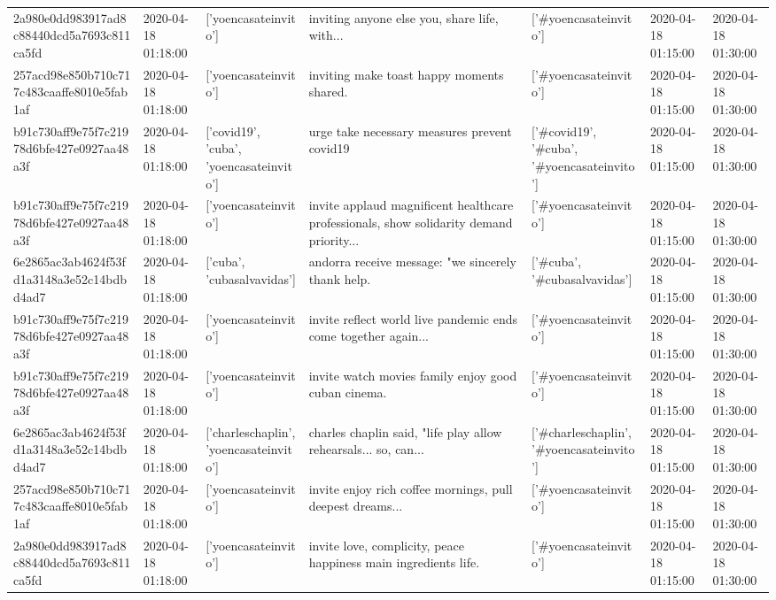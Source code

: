 \begin{tabular}{lllllll}
2a980e0dd983917ad8c88440dcd5a7693c811ca5fd & 2020-04-18 01:18:00 & ['yoencasateinvito'] & inviting anyone else you, share life, with... & ['#yoencasateinvito'] & 2020-04-18 01:15:00 & 2020-04-18 01:30:00 \\
257acd98e850b710c717c483caaffe8010e5fab1af & 2020-04-18 01:18:00 & ['yoencasateinvito'] & inviting make toast happy moments shared. & ['#yoencasateinvito'] & 2020-04-18 01:15:00 & 2020-04-18 01:30:00 \\
b91c730aff9e75f7c21978d6bfe427e0927aa48a3f & 2020-04-18 01:18:00 & ['covid19', 'cuba', 'yoencasateinvito'] & urge take necessary measures prevent covid19 & ['#covid19', '#cuba', '#yoencasateinvito'] & 2020-04-18 01:15:00 & 2020-04-18 01:30:00 \\
b91c730aff9e75f7c21978d6bfe427e0927aa48a3f & 2020-04-18 01:18:00 & ['yoencasateinvito'] & invite applaud magnificent healthcare professionals, show solidarity demand priority... & ['#yoencasateinvito'] & 2020-04-18 01:15:00 & 2020-04-18 01:30:00 \\
6e2865ac3ab4624f53fd1a3148a3e52c14bdbd4ad7 & 2020-04-18 01:18:00 & ['cuba', 'cubasalvavidas'] & andorra receive message: "we sincerely thank help. & ['#cuba', '#cubasalvavidas'] & 2020-04-18 01:15:00 & 2020-04-18 01:30:00 \\
b91c730aff9e75f7c21978d6bfe427e0927aa48a3f & 2020-04-18 01:18:00 & ['yoencasateinvito'] & invite reflect world live pandemic ends come together again... & ['#yoencasateinvito'] & 2020-04-18 01:15:00 & 2020-04-18 01:30:00 \\
b91c730aff9e75f7c21978d6bfe427e0927aa48a3f & 2020-04-18 01:18:00 & ['yoencasateinvito'] & invite watch movies family enjoy good cuban cinema. & ['#yoencasateinvito'] & 2020-04-18 01:15:00 & 2020-04-18 01:30:00 \\
6e2865ac3ab4624f53fd1a3148a3e52c14bdbd4ad7 & 2020-04-18 01:18:00 & ['charleschaplin', 'yoencasateinvito'] & charles chaplin said, "life play allow rehearsals... so, can... & ['#charleschaplin', '#yoencasateinvito'] & 2020-04-18 01:15:00 & 2020-04-18 01:30:00 \\
257acd98e850b710c717c483caaffe8010e5fab1af & 2020-04-18 01:18:00 & ['yoencasateinvito'] & invite enjoy rich coffee mornings, pull deepest dreams... & ['#yoencasateinvito'] & 2020-04-18 01:15:00 & 2020-04-18 01:30:00 \\
2a980e0dd983917ad8c88440dcd5a7693c811ca5fd & 2020-04-18 01:18:00 & ['yoencasateinvito'] & invite love, complicity, peace happiness main ingredients life. & ['#yoencasateinvito'] & 2020-04-18 01:15:00 & 2020-04-18 01:30:00 \\

\end{tabular}
